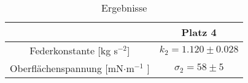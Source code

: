 \begin{table}[ht!]
	\centering
	\caption{Ergebnisse}
	\begin{tabular}{|c|c|}
		\hline
		& Platz 4 \\
		\hline
		Federkonstante [kg s$ ^{-2} $]& $k_{2}= 1.120\pm0.028 $ \\
		\hline
		Oberflächenspannung [mN$ \cdot $m$ ^{-1} $ ]& $\sigma_{2}= 58\pm 5$ \\
		\hline
	\end{tabular}
	\label{tab: Erg 2}
\end{table}